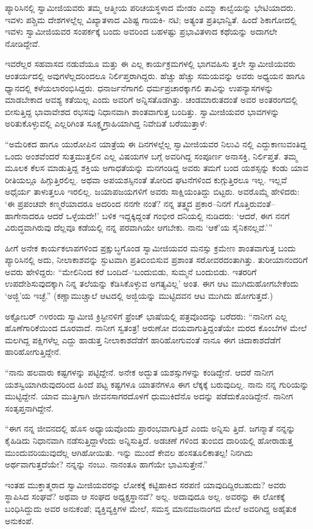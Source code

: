 ಪ್ಯಾರಿಸಿನಲ್ಲಿ ಸ್ವಾಮೀಜಿಯವರು ತಮ್ಮ ಆತ್ಮೀಯ ಪರಿಚಯಸ್ಥಳಾದ ಮೇಡಂ ಎಮ್ಮಾ ಕಾಲ್ವೆಯನ್ನು ಭೇಟಿಯಾದರು. ಇವಳು ಪಶ್ಚಿಮ ದೇಶಗಳಲ್ಲೆಲ್ಲ ವಿಖ್ಯಾತಳಾದ ವಿಶಿಷ್ಟ ಗಾಯಕಿ- ನಟಿ; ಅತ್ಯಂತ ಪ್ರತಿಭಾನ್ವಿತೆ. ಹಿಂದೆ ಶಿಕಾಗೋದಲ್ಲಿ ಇವಳು ಸ್ವಾಮೀಜಿಯವರ ಸಂಪರ್ಕಕ್ಕೆ ಬಂದು ಅವರಿಂದ ಬಹಳಷ್ಟು ಪ್ರಭಾವಿತಳಾದ ಕಥೆಯನ್ನು ಅದಾಗಲೇ ನೋಡಿದ್ದೇವೆ.

ಇವರೆಲ್ಲರ ಸಹವಾಸದ ನಡುವೆಯೂ ಮತ್ತು ಈ ಎಲ್ಲ ಕಾರ್ಯಕ್ರಮಗಳಲ್ಲಿ ಭಾಗವಹಿಸು ತ್ತಲೇ ಸ್ವಾಮೀಜಿಯವರು ಆಂತರ್ಯದಲ್ಲಿ ಅವುಗಳೆಲ್ಲದರಿಂದಲೂ ನಿರ್ಲಿಪ್ತರಾಗಿದ್ದರು. ಹೆಚ್ಚು ಹೆಚ್ಚು ಸಮಯವನ್ನು ಅವರು ಅಧ್ಯಯನ ಹಾಗೂ ಧ್ಯಾನದಲ್ಲಿ ಕಳೆಯಲಾರಂಭಿಸಿದ್ದರು. ಧನಾರ್ಜನೆಗಾಗಲಿ ಧರ್ಮಪ್ರಚಾರಕ್ಕಾಗಲಿ ತಾವಿನ್ನು ಉಪನ್ಯಾಸಗಳನ್ನು ಮಾಡಬೇಕಾದ ಆವಶ್ಯ ಕತೆಯಿಲ್ಲ ಎಂದು ಅವರಿಗೆ ಅನ್ನಿಸತೊಡಗಿತ್ತು. ಚಂಡಮಾರುತದಂತೆ ಅವರ ಅಂತರಂಗದಲ್ಲಿ ಬೀಸುತ್ತಿದ್ದ ಭಾವಾವೇಶದ ರಭಸವು ನಿಧಾನವಾಗಿ ಶಾಂತವಾಗುತ್ತ ಬಂದಿತ್ತು. ಸ್ವಾಮೀಜಿಯವರ ಭಾವಗಳನ್ನು ಅರಿತುಕೊಳ್ಳುವಲ್ಲಿ ಎಲ್ಲರಿಗಿಂತ ಸೂಕ್ಷ್ಮಗ್ರಾಹಿಯಾಗಿದ್ದ ನಿವೇದಿತೆ ಬರೆಯುತ್ತಾಳೆ:

“ಅಮೆರಿಕದ ಹಾಗೂ ಯುರೋಪಿನ ಯಾತ್ರೆಯ ಈ ದಿನಗಳಲ್ಲೆಲ್ಲ ಸ್ವಾಮೀಜಿಯವರ ನಿಲುವಿ ನಲ್ಲಿ ಎದ್ದುಕಾಣುವಂತಿದ್ದ ಒಂದು ಅಂಶವೆಂದರೆ ಸುತ್ತಮುತ್ತಲಿನ ಎಲ್ಲ ವಿಷಯಗಳ ಬಗ್ಗೆ ಅವರಿಗಿದ್ದ ಸಂಪೂರ್ಣ ಅನಾಸಕ್ತಿ, ನಿರ್ಲಿಪ್ತತೆ. ತಮ್ಮ ಮೂಲಕ ಕೆಲಸ ಮಾಡುತ್ತಿದ್ದ ಶಕ್ತಿಯ ಅಗಾಧತೆಯನ್ನು ಮನಗಂಡಿದ್ದ ಅವರು ತಮಗೆ ಬಂದ ಯಶಸ್ಸನ್ನು ಕಂಡು ಯಾವ ರೀತಿಯಲ್ಲೂ ಹಿಗ್ಗುತ್ತಿರಲಿಲ್ಲ. ಅಥವಾ ಅಪಯಶಸ್ಸಿನಂತೆ ತೋರಿದ ಘಟನೆಗಳಿಂದ ಕುಗ್ಗುತ್ತಿರಲೂ ಇಲ್ಲ. ಇಲ್ಲವೆ ಅಧೈರ್ಯ ತಾಳುತ್ತಲೂ ಇರಲಿಲ್ಲ. ಜಯಾಪಜಯಗಳಿಗೆ ಅವರು ಸಾಕ್ಷಿಯಂತಿದ್ದು ಬಿಟ್ಟರು. ಅವರೊಮ್ಮೆ ಹೇಳಿದರು: ‘ಈ ಪ್ರಪಂಚವೇ ಕಣ್ಮರೆಯಾದರೂ ಅದರಿಂದ ನನಗೇ ನಂತೆ? ನನ್ನ ತತ್ತ್ವದ ಪ್ರಕಾರ–ನಿನಗೆ ಗೊತ್ತಿರುವಂತೆ–ಹಾಗೇನಾದರೂ ಆದರೆ ಒಳ್ಳೆಯದೇ!’ ಬಳಿಕ ಇದ್ದಕ್ಕಿದ್ದಂತೆ ಗಂಭೀರ ದನಿಯಲ್ಲಿ ನುಡಿದರು: ‘ಆದರೆ, ಈಗ ನನಗೆ ವಿರುದ್ಧವಾಗಿರುವು ದೆಲ್ಲವೂ ಕಡೆಯಲ್ಲಿ ನನ್ನ ಪರವಾಗಿಯೇ ಆಗಬೇಕು. ನಾನು ‘ಆಕೆ’ಯ ಸೈನಿಕನಲ್ಲವೆ.’”

ಹೀಗೆ ಅನೇಕ ಕಾರ್ಯಕಲಾಪಗಳಿಂದ ಪ್ರಕ್ಷುಬ್ಧಗೊಂಡ ಸ್ವಾಮೀಜಿಯವರ ಮನಸ್ಸು ಕ್ರಮೇಣ ಶಾಂತವಾಗುತ್ತ ಬಂದು ಪ್ಯಾರಿಸಿನಲ್ಲಿ ಅದು, ನೀಲಾಕಾಶವನ್ನು ಸ್ಫುಟವಾಗಿ ಪ್ರತಿಬಿಂಬಿಸುವ ಪ್ರಶಾಂತ ಸರೋವರದಂತಾಗಿತ್ತು. ತುರೀಯಾನಂದರಿಗೆ ಅವರು ಹೇಳಿದ್ದರು: “ಮೇಲಿನಿಂದ ಕರೆ ಬಂದಿದೆ–‘ಬಂದುಬಿಡು, ಸುಮ್ಮನೆ ಬಂದುಬಿಡು. ಇತರರಿಗೆ ಉಪದೇಶಿಸುವುದಕ್ಕಾಗಿ ನಿನ್ನ ತಲೆಯನ್ನು ಕೆಡಿಸಿಕೊಳ್ಳುವ ಅಗತ್ಯವಿಲ್ಲ’ ಅಂತ. ಈಗ ಆಟ ಮುಗಿದುಹೋಗಬೇಕೆಂದು ‘ಅಜ್ಜಿ’ಯ ಇಚ್ಛೆ.” (ಕಣ್ಣಾಮುಚ್ಚಾಲೆ ಆಟದಲ್ಲಿ ಅಜ್ಜಿಯನ್ನು ಮುಟ್ಟಿದವನ ಆಟ ಮುಗಿದು ಹೋಗುತ್ತದೆ.)

ಅಕ್ಟೋಬರ್ ೧೪ರಂದು ಸ್ವಾಮೀಜಿ ಕ್ರಿಸ್ಟೀನಳಿಗೆ ಫ್ರೆಂಚ್ ಭಾಷೆಯಲ್ಲಿ ಪತ್ರವೊಂದನ್ನು ಬರೆದರು: “ನಾನೀಗ ಎಲ್ಲ ಹೊಣೆಗಾರಿಕೆಯಿಂದ ದೂರವಾದೆ. ನಾನೀಗ ಸ್ವತಂತ್ರ! ಅರುಣೋ ದಯವಾಗುತ್ತಿದ್ದಂತೆಯೇ ಮರದ ಕೊಂಬೆಗಳ ಮೇಲೆ ಮಲಗಿದ್ದ ಪಕ್ಷಿಗಳೆಲ್ಲ ಎದ್ದು ಹಾಡುತ್ತ ನೀಲಾಕಾಶದೆಡೆಗೆ ಹಾರಿಹೋಗುವಂತೆ ನಾನೂ ಈಗ ಚಿದಾಕಾಶದೆಡೆಗೆ ಹಾರಿಹೋಗುತ್ತಿದ್ದೇನೆ.

“ನಾನು ಹಲವಾರು ಕಷ್ಟಗಳನ್ನು ಪಟ್ಟಿದ್ದೇನೆ. ಅನೇಕ ಅದ್ಭುತ ಯಶಸ್ಸುಗಳನ್ನು ಕಂಡಿದ್ದೇನೆ. ಆದರೆ ನಾನೀಗ ಯಶಸ್ವಿಯಾಗಿರುವುದರಿಂದ ಹಿಂದೆ ಪಟ್ಟ ಕಷ್ಟಗಳೂ ಯಾತನೆಗಳೂ ಈಗ ಲೆಕ್ಕಕ್ಕೆ ಬರುವುದಿಲ್ಲ. ನಾನು ನನ್ನ ಗುರಿಯನ್ನು ಮುಟ್ಟಿದ್ದೇನೆ. ಯಾವ ಮುತ್ತಿಗಾಗಿ ಜೀವನಸಾಗರದೊಳಗೆ ಧುಮುಕಿದೆನೊ ಅದನ್ನು ಪಡೆದುಕೊಂಡಿದ್ದೇನೆ. ನಾನೀಗ ಸಂತೃಪ್ತನಾಗಿದ್ದೇನೆ.

“ಈಗ ನನ್ನ ಜೀವನದಲ್ಲಿ ಹೊಸ ಅಧ್ಯಾಯವೊಂದು ಪ್ರಾರಂಭವಾಗುತ್ತಿದೆ ಎಂದು ಅನ್ನಿಸು ತ್ತಿದೆ. ಜಗನ್ಮಾತೆ ನನ್ನನ್ನು ಕೈಹಿಡಿದು ನಿಧಾನವಾಗಿ ನಡೆಸುತ್ತಿದ್ದಾಳೆಂದು ಅನ್ನಿಸುತ್ತಿದೆ. ಅಡಚಣೆ ಗಳಿಂದ ತುಂಬಿದ ದಾರಿಯಲ್ಲಿ ಹೋರಾಡುತ್ತ ಮುಂದುವರಿಯುವುದೆಲ್ಲ ಆಗಿಹೋಯಿತು. ಇನ್ನು ಮುಂದೆ ಕೇವಲ ಹಂಸತೂಲಿಕಾತಲ್ಪ! ನಿನಗಿದು ಅರ್ಥವಾಗುತ್ತದೆಯೇ? ನನ್ನನ್ನು ನಂಬು. ನಾನಂತೂ ಹಾಗೆಯೇ ಭಾವಿಸುತ್ತೇನೆ.”

ಇಂತಹ ಮುಕ್ತಾತ್ಮರಾದ ಸ್ವಾಮೀಜಿಯವರನ್ನು ಲೋಕಕ್ಕೆ ಕಟ್ಟಿಹಾಕಿದ ಸರಪಣಿ ಯಾವುದಿದ್ದಿರಬಹುದು? ಅವರು ಸ್ಥಾಪಿಸಿದ ಸಂಘವೆ? ಅಥವಾ ಆ ಸಂಘದ ಅಧ್ಯಕ್ಷಸ್ಥಾನವೆ? ಅಲ್ಲ. ಅದಾವುದೂ ಅಲ್ಲ. ಅವರನ್ನು ಈ ಲೋಕಕ್ಕೆ ಬಂಧಿಸಿದ್ದುದು ಅವರ ಅನುಕಂಪೆ; ವ್ಯಕ್ತಿವ್ಯಕ್ತಿಗಳ ಮೇಲೆ, ಸಮಸ್ತ ಮಾನವಜನಾಂಗದ ಮೇಲೆ ಅವರಿಗಿದ್ದ ಅಹೈತುಕ ಅನುಕಂಪೆ.

